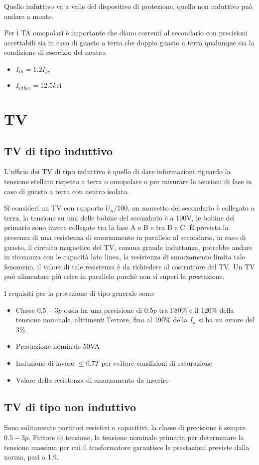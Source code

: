 Quello induttivo va a valle del dispositivo di protezione, quello non induttivo può andare a monte.

Per i TA omopolari è importante che diano correnti al secondario con precisioni accettabili sia in caso di guasto a terra che doppio guasto a terra qualunque sia la condizione di esercizio del neutro.
\begin{itemize}
    \item $I_{th} = 1.2 I_{sr}$
    \item $I_{nthcc} = 12.5 kA$
\end{itemize}


\section{TV}
\subsection{TV di tipo induttivo}
L'ufficio dei TV di tipo induttivo è quello di dare informazioni riguardo la tensione stellata rispetto a terra o omopolare o per misurare le tensioni di fase in caso di guasto a terra con neutro isolato.

Si consideri un TV con rapporto $U_n/100$, un morsetto del secondario è collegato a terra, la tensione su una delle bobine del secondario è a 100V, le bobine del primario sono invece collegate tra la fase A e B e tra B e C.
È prevista la presenza di una resistenza di smorzamento in parallelo al secondario, in caso di guasto, il circuito magnetico del TV, conuna grande induttanza, potrebbe andare in risonanza con le capacità lato linea, la resistenza di smorzamento limita tale fenomeno, il valore di tale resistenza è da richiedere al costruttore del TV. Un TV può alimentare più relee in parallelo purchè non si superi la prestazione.

I requisiti per la protezione di tipo generale sono:
\begin{itemize}
    \item Classe $0.5-3p$ ossia ha una precisione di $0.5p$ tra l'80\% e il 120\% della tensione nominale, altrimenti l'errore, fino al 190\% della $I_n$ si ha un errore del $3\%$.
    \item Prestazione nominale 50VA
    \item Induzione di lavoro $\leq 0.7T$ per evitare condizioni di saturazione
    \item Valore della resistenza di smorzamento da inserire
\end{itemize}


\subsection{TV di tipo  non induttivo}
Sono solitamente partitori resistivi o capacitivi, la classe di precisione è sempre $0.5-3p$.
Fattore di tensione, la tensione nominale primaria per determinare la tensione massima per cui il trasformatore garantisce le prestazioni previste dalla norma, pari a 1.9.

